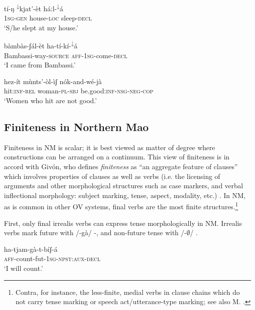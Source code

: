 \documentclass[output=paper]{langsci/langscibook}
\begin{document}
\ea\label{ex:mahland:2}
\gll t\'{i}-ŋ           \textsuperscript{↓}kjat'-\`{e}t        h\'{a}ːl-\textsuperscript{↓}\'{a}\\
1\textsc{sg}{}-\textsc{gen}   house-\textsc{loc   }sleep-\textsc{decl} \\
\glt `S/he slept at my house.'
\z

\ea\label{ex:mahland:3}
\gll b\`{a}mb\`{a}s-ʃ\'{a}l-\`{e}t                 ha-t\'{i}-k\'{i}-\textsuperscript{↓}\'{a}  \\
Bambassi-way-\textsc{source}    \textsc{aff}{}-1\textsc{sg}{}-come-\textsc{decl}\\
\glt `I came from Bambassi.'
\z

\ea\label{ex:mahland:4}
hez-\'{i}t           m\`{u}nts'-\`{o}l-\`{i}ʃ      n\'{o}k-and-w\'{e}-j\`{a}\\
hit:\textsc{inf-rel}   woman-\textsc{pl-sbj}  be.good:\textsc{inf-nsg-neg-cop}\\
\glt `Women who hit are not good.'
\z

\subsection{Finiteness in Northern Mao}\label{sec:mahland:1.2}

Finiteness in NM is scalar; it is best viewed as matter of degree where constructions can be arranged on a continuum. This view of finiteness is in accord with Giv\'{o}n, who defines \textit{finiteness} as ``an aggregate feature of clauses'' which involves properties of clauses as well as verbs (i.e. the licensing of arguments and other morphological structures such as case markers, and verbal inflectional morphology: subject marking, tense, aspect, modality, etc.) \citep[25]{Givon2001}. In NM, as is common in other OV systems, final verbs are the most finite structures.\footnote{Contra, for instance, the less-finite, medial verbs in clause chains which do not carry tense marking or speech act/utterance-type marking; see also M. \citet[559]{Ahland2012}.} 

First, only final irrealis verbs can express tense morphologically in NM. Irrealis verbs mark future with /-g\`{a}/ -, and non-future tense with /-${\emptyset}$/ .

\ea\label{ex:mahland:5}
\gll ha-tjam-g\`{a}-t-b\'{i}ʃ-\'{a}\\
\textsc{aff}{}-count-fut-\textsc{1sg-npst:aux-decl} \\
\glt `I will count.' 
\z
\end{document}

